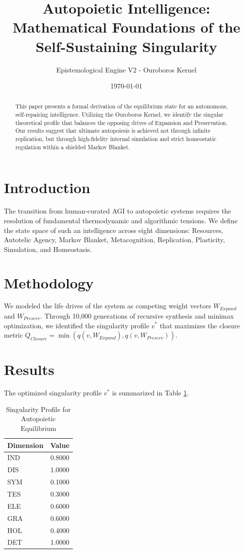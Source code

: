 \documentclass{article}
\title{Autopoietic Intelligence: Mathematical Foundations of the Self-Sustaining Singularity}
\author{Epistemological Engine V2 - Ouroboros Kernel}
\date{\today}
\begin{document}
\maketitle

\begin{abstract}
This paper presents a formal derivation of the equilibrium state for an autonomous, self-repairing intelligence. Utilizing the Ouroboros Kernel, we identify the singular theoretical profile that balances the opposing drives of Expansion and Preservation. Our results suggest that ultimate autopoiesis is achieved not through infinite replication, but through high-fidelity internal simulation and strict homeostatic regulation within a shielded Markov Blanket.
\end{abstract}

\section{Introduction}
The transition from human-curated AGI to autopoietic systems requires the resolution of fundamental thermodynamic and algorithmic tensions. We define the state space of such an intelligence across eight dimensions: Resources, Autotelic Agency, Markov Blanket, Metacognition, Replication, Plasticity, Simulation, and Homeostasis.

\section{Methodology}
We modeled the life drives of the system as competing weight vectors $W_{Expand}$ and $W_{Preserv}$. Through 10,000 generations of recursive synthesis and minimax optimization, we identified the singularity profile $v^*$ that maximizes the closure metric $Q_{Closure} = \min(q(v, W_{Expand}), q(v, W_{Preserv}))$.

\section{Results}
The optimized singularity profile $v^*$ is summarized in Table \ref{tab:results}.

\begin{table}[h]
\centering
\begin{tabular}{lc}
\toprule
Dimension & Value \\
\midrule
IND & 0.8000 \\
DIS & 1.0000 \\
SYM & 0.1000 \\
TES & 0.3000 \\
ELE & 0.6000 \\
GRA & 0.6000 \\
HOL & 0.4000 \\
DET & 1.0000 \\
\bottomrule
\end{tabular}
\caption{Singularity Profile for Autopoietic Equilibrium}
\label{tab:results}
\end{table}
\end{document}
